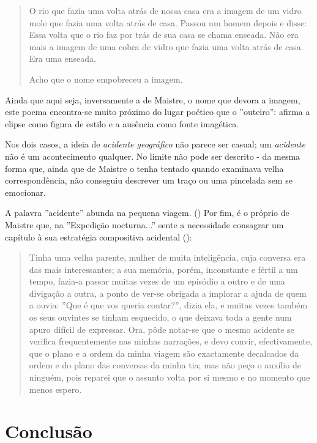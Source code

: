 \documentclass[12pt]{article}
\begin{document}
\begin{quote}
  O rio que fazia uma volta atrás de nossa casa
era a imagem de um vidro mole que fazia uma
volta atrás de casa.
Passou um homem depois e disse: Essa volta
que o rio faz por trás de sua casa se chama
enseada.
Não era mais a imagem de uma cobra de vidro
que fazia uma volta atrás de casa.
Era uma enseada.

Acho que o nome empobreceu a imagem. 
\end{quote}

Ainda que aqui seja, inversamente a de Maistre, o nome que devora a
imagem, este poema encontra-se muito próximo do lugar poético que o
''outeiro'': afirma a elipse como figura de estilo e a ausência como
fonte imagética.

Nos dois casos, a ideia de \emph{acidente geográfico} não parece ser
casual; um \emph{acidente} não é um acontecimento qualquer. No limite
não pode ser descrito - da mesma forma que, ainda que de Maistre o
tenha tentado quando examinava velha correspondência, não conseguiu
descrever um traço ou uma pincelada sem se
emocionar. \cite[p.xxx?]{demaistre}

A palavra ''acidente'' abunda na pequena viagem. (\cite[pxxx, pxxx,
  pxxx, pxxx, pxxx]{demaistre}) Por fim, é o próprio de Maistre que,
na ''Expedição nocturna...''  sente a necessidade consagrar um
capítulo à sua estratégia compositiva acidental
(\cite[p.xxx?]{demaistre}):

\begin{quote}
  Tinha uma velha parente, mulher de muita inteligência, cuja conversa
  era das mais interessantes; a sua memória, porém, inconstante e
  fértil a um tempo, fazia-a passar muitas vezes de um episódio a
  outro e de uma divigação a outra, a ponto de ver-se obrigada a
  implorar a ajuda de quem a ouvia: ''Que é que vos queria contar?'',
  dizia ela, e muitas vezes também os seus ouvintes se tinham
  esquecido, o que deixava toda a gente num apuro difícil de
  expressar. Ora, pôde notar-se que o mesmo acidente se verifica
  frequentemente nas minhas narrações, e devo convir, efectivamente,
  que o plano e a ordem da minha viagem são exactamente decalcados da
  ordem e do plano das conversas da minha tia; mas não peço o auxílio
  de ninguém, pois reparei que o assunto volta por si mesmo e no
  momento que menos espero.
\end{quote}

\section{Conclusão}
\end{document}

